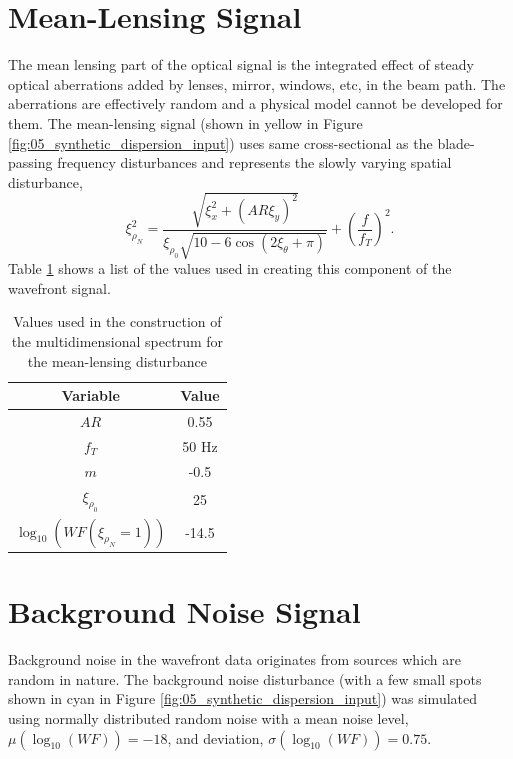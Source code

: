 \section{Mean-Lensing Signal}
The mean lensing part of the optical signal is the integrated effect of steady optical aberrations added by lenses, mirror, windows, etc, in the beam path.
The aberrations are effectively random and a physical model cannot be developed for them.
The mean-lensing signal (shown in yellow in Figure \ref{fig:05_synthetic_dispersion_input}) uses same cross-sectional as the blade-passing frequency disturbances and represents the slowly varying spatial disturbance,
\begin{equation}
  \xi_{\rho_N}^2 = \frac{\sqrt{\xi_x^2+(AR\xi_y)^2}}{\xi_{\rho_0}\sqrt{10-6\cos(2\xi_\theta+\pi)}}+\left(\frac{f}{f_T}\right)^2 \textrm{.}
  \label{eqn:05_mean_lensing}
\end{equation}
Table \ref{tab:05_mean_lensing} shows a list of the values used in creating this component of the wavefront signal.
\begin{table}
  \centering
  \caption{Values used in the construction of the multidimensional spectrum for the mean-lensing disturbance}
  \begin{tabular}{c c}
    Variable & Value \\
    \hline \hline
    $AR$ & 0.55 \\
    $f_T$ & 50 Hz \\
    $m$ & -0.5 \\
    $\xi_{\rho_0}$ & 25 \\
    $\log_{10}(WF(\xi_{\rho_N}=1))$ & -14.5
  \end{tabular}
  \label{tab:05_mean_lensing}
\end{table}

\section{Background Noise Signal}
Background noise in the wavefront data originates from sources which are random in nature.
The background noise disturbance (with a few small spots shown in cyan in Figure \ref{fig:05_synthetic_dispersion_input}) was simulated using normally distributed random noise with a mean noise level, $\mu(\log_{10}(WF))=-18$, and deviation, $\sigma(\log_{10}(WF))=0.75$.

